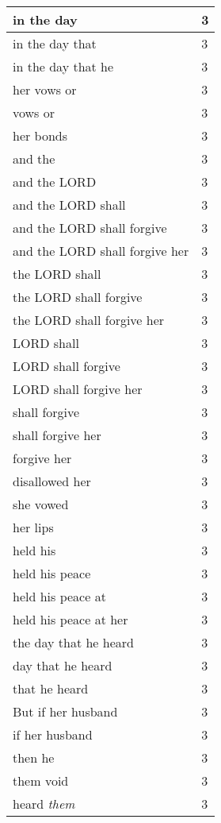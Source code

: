 \begin{center}
\begin{longtable}{|p{3.0in}|p{0.5in}|}
in the day & 3\\ \hline 
in the day that & 3\\ \hline 
in the day that he & 3\\ \hline 
her vows or & 3\\ \hline 
vows or & 3\\ \hline 
her bonds & 3\\ \hline 
and the & 3\\ \hline 
and the LORD & 3\\ \hline 
and the LORD shall & 3\\ \hline 
and the LORD shall forgive & 3\\ \hline 
and the LORD shall forgive her & 3\\ \hline 
the LORD shall & 3\\ \hline 
the LORD shall forgive & 3\\ \hline 
the LORD shall forgive her & 3\\ \hline 
LORD shall & 3\\ \hline 
LORD shall forgive & 3\\ \hline 
LORD shall forgive her & 3\\ \hline 
shall forgive & 3\\ \hline 
shall forgive her & 3\\ \hline 
forgive her & 3\\ \hline 
disallowed her & 3\\ \hline 
she vowed & 3\\ \hline 
her lips & 3\\ \hline 
held his & 3\\ \hline 
held his peace & 3\\ \hline 
held his peace at & 3\\ \hline 
held his peace at her & 3\\ \hline 
the day that he heard & 3\\ \hline 
day that he heard & 3\\ \hline 
that he heard & 3\\ \hline 
But if her husband & 3\\ \hline 
if her husband & 3\\ \hline 
then he & 3\\ \hline 
them void & 3\\ \hline 
heard \emph{them} & 3\\ \hline 
\end{longtable}
\end{center}






